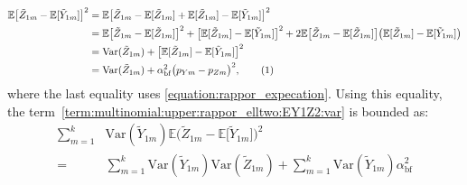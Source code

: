 \documentclass[twoside,11pt]{article}
\newcommand\numberthis{\addtocounter{equation}{1}\tag{\theequation}}
\newcommand{\rvTwo}{Y}
\newcommand{\rvThree}{Z}
\newcommand{\private}[1]{\tilde{#1}}
\newcommand{\mE}{\mathbb{E}} %
\newcommand{\alphabetSize}{k} %
\newcommand{\vectorIndex}{m}
\newcommand{\probVecElement}[2]{p_{{#1}{#2}}}
\newcommand{\privacyParameter}{\alpha} %
\newcommand{\privacyParameterrappor}{\privacyParameter_{\mathrm{bf}}}
\begin{document}
\begin{appendix}
	\begin{align*}
		\mE
		\bigl[ %
		\private{\rvThree}_{1 \vectorIndex}
		-
		\mE
		[
		\private{\rvTwo}_{1 \vectorIndex}
		]
		\bigr]^2
		&=
		\mE
		\bigl[ %
		\private{\rvThree}_{1 \vectorIndex}
		-
		\mE
		[
		\private{\rvThree}_{1 \vectorIndex}
		]
		+
		\mE
		[
		\private{\rvThree}_{1 \vectorIndex}
		]
		-
		\mE
		[
		\private{\rvTwo}_{1 \vectorIndex}
		]
		\bigr]^2
		\\&=
		\mE
		\bigl[ %
		\private{\rvThree}_{1 \vectorIndex}
		-
		\mE
		[
		\private{\rvThree}_{1 \vectorIndex}
		]
		\bigr]^2
		+
		\bigl[
		\mE
		[
		\private{\rvThree}_{1 \vectorIndex}
		]
		-
		\mE
		[
		\private{\rvTwo}_{1 \vectorIndex}
		]
		\bigr]^2
		+2
		\mE
		\bigl[ %
		\private{\rvThree}_{1 \vectorIndex}
		-
		\mE
		[
		\private{\rvThree}_{1 \vectorIndex}
		]
		\bigr]
		\bigl(
		\mE
		[
		\private{\rvThree}_{1 \vectorIndex}
		]
		-
		\mE
		[
		\private{\rvTwo}_{1 \vectorIndex}
		]
		\bigr)
		\\&=
		\mathrm{Var}(
		\private{\rvThree}_{1 \vectorIndex}
		)
		+
		\bigl[
		\mE
		[
		\private{\rvThree}_{1 \vectorIndex}
		]
		-
		\mE
		[
		\private{\rvTwo}_{1 \vectorIndex}
		]
		\bigr]^2
		\\&=
		\mathrm{Var}(
		\private{\rvThree}_{1 \vectorIndex}
		)
		+
		\privacyParameterrappor ^2
		\bigl(  \probVecElement{\rvTwo}{\vectorIndex} - \probVecElement{\rvThree}{\vectorIndex}\bigr)^2,
		\numberthis
		\label{term:multinomial:upper:rappor_elltwo:EY1Z2:var:trick}
	\end{align*}
	where the last equality uses \eqref{equation:rappor_expecation}.
	Using this equality, the term~\eqref{term:multinomial:upper:rappor_elltwo:EY1Z2:var} is bounded as:
	\begin{align*}
		\sum_{\vectorIndex = 1}^\alphabetSize
		&
		\mathrm{Var}(\private{Y}_{1 \vectorIndex})
		\mE
		\bigl( %
		\private{\rvThree}_{1 \vectorIndex}
		-
		\mE
		\bigl[
		\private{\rvTwo}_{1 \vectorIndex}
		\bigr]
		\bigr)^2
		\\= ~ &
		\sum_{\vectorIndex = 1}^\alphabetSize
		\mathrm{Var}(\private{Y}_{1 \vectorIndex})
		\mathrm{Var}(
		\private{\rvThree}_{1 \vectorIndex}
		)
		+
		\sum_{\vectorIndex = 1}^\alphabetSize
		\mathrm{Var}(\private{Y}_{1 \vectorIndex})
		\privacyParameterrappor ^2

\end{align*}
\end{appendix}
\end{document}
